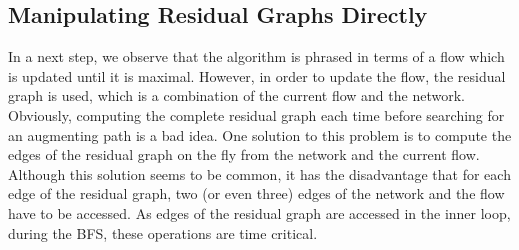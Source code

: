 \documentclass{llncs}
\begin{document}
%   
% 
%   
%   
     
  \subsection{Manipulating Residual Graphs Directly}\label{sec:impl_res_graph}
  In a next step, we observe that the algorithm is phrased in terms of a flow which is updated until it is maximal. However,
  in order to update the flow, the residual graph is used, which is a combination of the current flow and the network.
  Obviously, computing the complete residual graph each time before searching for an augmenting path is a bad idea. 
  One solution to this problem is to compute the edges of the residual graph on the fly from the network and the current flow.
  Although this solution seems to be common, it has the disadvantage that for each edge of the residual graph, two (or even three) 
  edges of the network and the flow have to be accessed. As edges of the residual graph are accessed in the inner loop, during 
  the BFS, these operations are time critical.
  
\end{document}
